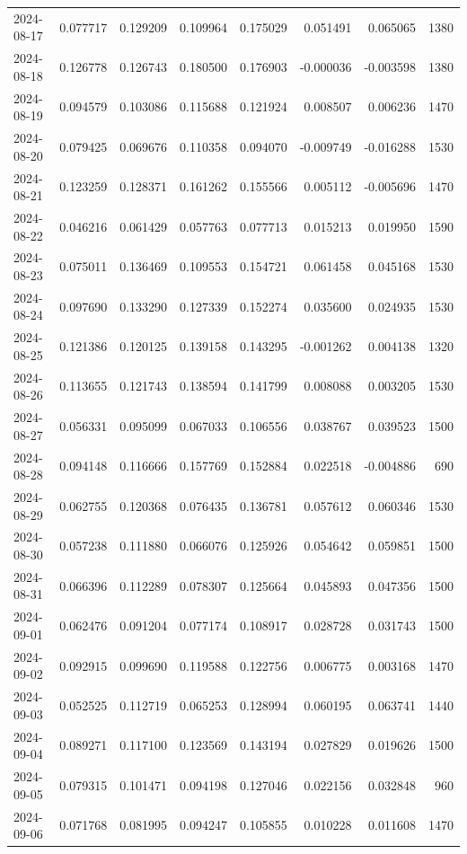 \begin{tabular}{lrrrrrrr}
2024-08-17 & 0.077717 & 0.129209 & 0.109964 & 0.175029 & 0.051491 & 0.065065 & 1380 \\
2024-08-18 & 0.126778 & 0.126743 & 0.180500 & 0.176903 & -0.000036 & -0.003598 & 1380 \\
2024-08-19 & 0.094579 & 0.103086 & 0.115688 & 0.121924 & 0.008507 & 0.006236 & 1470 \\
2024-08-20 & 0.079425 & 0.069676 & 0.110358 & 0.094070 & -0.009749 & -0.016288 & 1530 \\
2024-08-21 & 0.123259 & 0.128371 & 0.161262 & 0.155566 & 0.005112 & -0.005696 & 1470 \\
2024-08-22 & 0.046216 & 0.061429 & 0.057763 & 0.077713 & 0.015213 & 0.019950 & 1590 \\
2024-08-23 & 0.075011 & 0.136469 & 0.109553 & 0.154721 & 0.061458 & 0.045168 & 1530 \\
2024-08-24 & 0.097690 & 0.133290 & 0.127339 & 0.152274 & 0.035600 & 0.024935 & 1530 \\
2024-08-25 & 0.121386 & 0.120125 & 0.139158 & 0.143295 & -0.001262 & 0.004138 & 1320 \\
2024-08-26 & 0.113655 & 0.121743 & 0.138594 & 0.141799 & 0.008088 & 0.003205 & 1530 \\
2024-08-27 & 0.056331 & 0.095099 & 0.067033 & 0.106556 & 0.038767 & 0.039523 & 1500 \\
2024-08-28 & 0.094148 & 0.116666 & 0.157769 & 0.152884 & 0.022518 & -0.004886 & 690 \\
2024-08-29 & 0.062755 & 0.120368 & 0.076435 & 0.136781 & 0.057612 & 0.060346 & 1530 \\
2024-08-30 & 0.057238 & 0.111880 & 0.066076 & 0.125926 & 0.054642 & 0.059851 & 1500 \\
2024-08-31 & 0.066396 & 0.112289 & 0.078307 & 0.125664 & 0.045893 & 0.047356 & 1500 \\
2024-09-01 & 0.062476 & 0.091204 & 0.077174 & 0.108917 & 0.028728 & 0.031743 & 1500 \\
2024-09-02 & 0.092915 & 0.099690 & 0.119588 & 0.122756 & 0.006775 & 0.003168 & 1470 \\
2024-09-03 & 0.052525 & 0.112719 & 0.065253 & 0.128994 & 0.060195 & 0.063741 & 1440 \\
2024-09-04 & 0.089271 & 0.117100 & 0.123569 & 0.143194 & 0.027829 & 0.019626 & 1500 \\
2024-09-05 & 0.079315 & 0.101471 & 0.094198 & 0.127046 & 0.022156 & 0.032848 & 960 \\
2024-09-06 & 0.071768 & 0.081995 & 0.094247 & 0.105855 & 0.010228 & 0.011608 & 1470 \\

\end{tabular}
